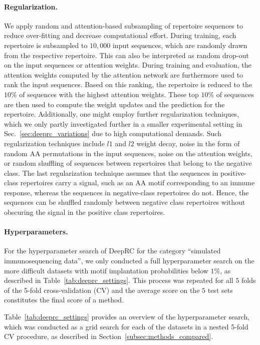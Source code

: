 \documentclass[oneside]{book}
\begin{document}
\paragraph{Regularization.}
We apply random and attention-based subsampling of repertoire sequences to
reduce over-fitting and decrease computational effort.
During training, each repertoire is subsampled to $10,000$ input sequences,
which are randomly drawn from the respective repertoire.
This can also be interpreted as random drop-out \citep{hinton2012improving} on 
the input sequences or attention weights.
During training and evaluation,
the attention weights computed by the attention network are furthermore used to 
rank the input sequences.
Based on this ranking, the repertoire is reduced to the $10\%$ of sequences 
with the highest attention weights.
These top $10\%$ of sequences are then used to compute the weight updates and
the prediction for the repertoire.
Additionally, one might employ further regularization techniques,
which we only partly investigated further in a smaller experimental setting in Sec.~\ref{sec:deeprc_variations} due to high computational demands.
Such regularization techniques include
$l1$ and $l2$ weight decay,
noise in the form of random AA permutations in the input sequences,
noise on the attention weights,
or random shuffling of sequences between repertoires that belong to the negative class.
The last regularization technique assumes that the sequences in positive-class repertoires 
carry a signal, such as an AA motif corresponding to an immune response,
whereas the sequences in negative-class repertoires do not.
Hence, the sequences can be shuffled randomly between negative class repertoires without obscuring the 
signal in the positive class repertoires.
%


\paragraph{Hyperparameters.} 
For the hyperparameter search of DeepRC for the category ``simulated 
immunosequencing data'',
we only conducted a full hyperparameter 
search on the more difficult datasets with motif implantation probabilities below $1\%$,
as described in Table~\ref{tab:deeprc_settings}.
This process was repeated for all $5$ folds of the 5-fold cross-validation (CV) and 
the average score on the $5$ test sets constitutes the final score of a method.
%

Table~\ref{tab:deeprc_settings} provides an overview of the hyperparameter 
search,
which was conducted as a grid search
for each of the datasets in a nested 5-fold CV procedure,
as described in Section~\ref{subsec:methods_compared}.
\end{document}
